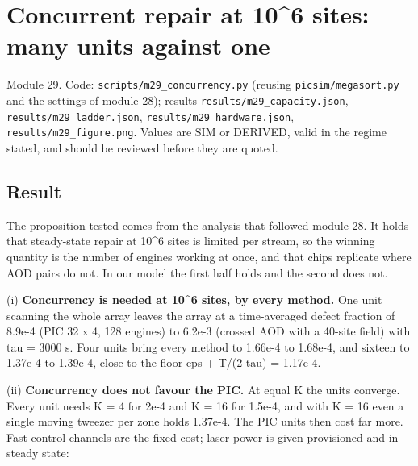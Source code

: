 \hypertarget{concurrent-repair-at-106-sites-many-units-against-one}{%
\chapter{Concurrent repair at 10\^{}\label{doc:concurrency}6 sites: many units against
one}\label{concurrency-concurrent-repair-at-106-sites-many-units-against-one}}

Module 29. Code: \texttt{scripts/m29\_concurrency.py} (reusing
\texttt{picsim/megasort.py} and the settings of module 28); results
\texttt{results/m29\_capacity.json}, \texttt{results/m29\_ladder.json},
\texttt{results/m29\_hardware.json}, \texttt{results/m29\_figure.png}.
Values are SIM or DERIVED, valid in the regime stated, and should be
reviewed before they are quoted.

\hypertarget{1-result}{%
\section{Result}\label{concurrency-1-result}}

The proposition tested comes from the analysis that followed module 28.
It holds that steady-state repair at 10\^{}6 sites is limited per
stream, so the winning quantity is the number of engines working at
once, and that chips replicate where AOD pairs do not. In our model the
first half holds and the second does not.

(i) \textbf{Concurrency is needed at 10\^{}6 sites, by every method.}
One unit scanning the whole array leaves the array at a time-averaged
defect fraction of 8.9e-4 (PIC 32 x 4, 128 engines) to 6.2e-3 (crossed
AOD with a 40-site field) with tau = 3000 s. Four units bring every
method to 1.66e-4 to 1.68e-4, and sixteen to 1.37e-4 to 1.39e-4, close
to the floor eps + T/(2 tau) = 1.17e-4.

(ii) \textbf{Concurrency does not favour the PIC.} At equal K the units
converge. Every unit needs K = 4 for 2e-4 and K = 16 for 1.5e-4, and
with K = 16 even a single moving tweezer per zone holds 1.37e-4. The PIC
units then cost far more. Fast control channels are the fixed cost;
laser power is given provisioned and in steady state:

